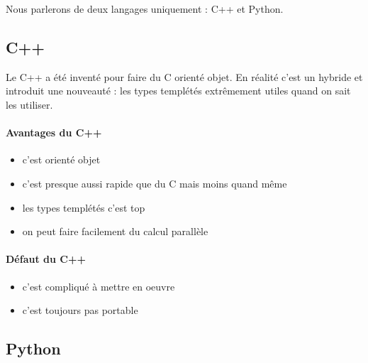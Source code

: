 
Nous parlerons de deux langages uniquement : C++ et Python. 

\subsection{C++}

Le C++ a été inventé pour faire du C orienté objet. En réalité c'est un hybride et introduit une
nouveauté : les types templétés extrêmement utiles quand on sait les utiliser.


\paragraph{Avantages du C++}

\begin{itemize}
\item c'est orienté objet
\item c'est presque aussi rapide que du C mais moins quand même
\item les types templétés c'est top
\item on peut faire facilement du calcul parallèle %
\end{itemize}

\paragraph{Défaut du C++}

\begin{itemize}
\item c'est compliqué à mettre en oeuvre
\item c'est toujours pas portable %
\end{itemize}

\subsection{Python}


